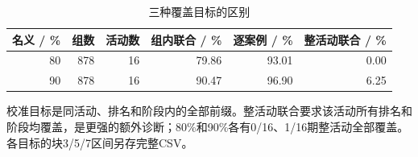 \begin{table}[!htbp]\centering
\caption{三种覆盖目标的区别}\label{tab:intervaltargets}
\small\setlength{\tabcolsep}{4pt}\renewcommand{\arraystretch}{1.15}
\begin{tabularx}{\linewidth}{r r r r r r}\toprule
名义 / \% & 组数 & 活动数 & 组内联合 / \% & 逐案例 / \% & 整活动联合 / \% \\
\midrule
80 & 878 & 16 & 79.86 & 93.01 & 0.00 \\
90 & 878 & 16 & 90.47 & 96.90 & 6.25 \\
\bottomrule\end{tabularx}
\par\vspace{4pt}\begin{minipage}{\linewidth}\footnotesize 校准目标是同活动、排名和阶段内的全部前缀。整活动联合要求该活动所有排名和阶段均覆盖，是更强的额外诊断；80\%和90\%各有0/16、1/16期整活动全部覆盖。各目标的块3/5/7区间另存完整CSV。\end{minipage}
\end{table}
